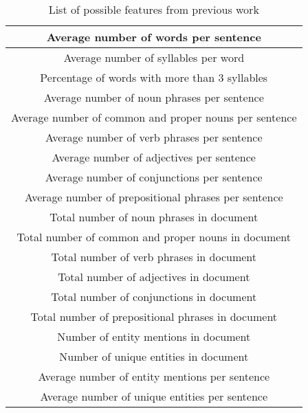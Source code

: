 \documentclass[]{article}
\begin{document}
\begin{table}[!htbp]
	\begin{center}
		\begin{tabular}{| c |} \hline
			Average number of words per sentence \\ \hline
			Average number of syllables per word \\ \hline
			Percentage of words with more than 3 syllables \\ \hline
			Average number of noun phrases per sentence \\ \hline
			Average number of common and proper nouns per sentence \\ \hline
			Average number of verb phrases per sentence \\ \hline
			Average number of adjectives per sentence \\  \hline
			Average number of conjunctions per sentence \\ \hline
			Average number of prepositional phrases per sentence \\ \hline
			Total number of noun phrases in document \\ \hline
			Total number of common and proper nouns in document \\ \hline
			Total number of verb phrases in document \\ \hline
			Total number of adjectives in document \\ \hline
			Total number of conjunctions in document \\ \hline
			Total number of prepositional phrases in document \\ \hline
			Number of entity mentions in document \\ \hline
			Number of unique entities in document \\ \hline
			Average number of entity mentions per sentence \\ \hline
			Average number of unique entities per sentence \\ \hline
		\end{tabular}
	\end{center}
	\caption{List of possible features from previous work \cite{feng2009cognitively}}
	\label{table:features1}
\end{table}
\end{document}
